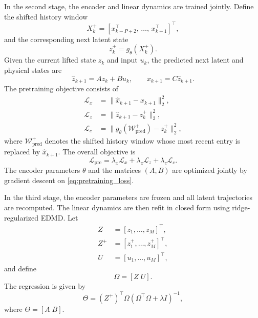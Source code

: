 \documentclass[journal]{IEEEtran}
\begin{document}
In the second stage, the encoder and linear dynamics are trained jointly. Define the shifted history window
\begin{equation}
    X_k^{+} = [x_{k-P+2}^\top,\,\ldots,\,x_{k+1}^\top]^\top,
\end{equation}
and the corresponding next latent state
\begin{equation}
    z_k^{+} = g_\theta(X_k^{+}).
\end{equation}
Given the current lifted state $z_k$ and input $u_k$, the predicted next latent and physical states are
\begin{equation}
    \hat{z}_{k+1} = A z_k + B u_k,
    \qquad
    \hat{x}_{k+1} = C \hat{z}_{k+1}.
\end{equation}
The pretraining objective consists of
\begin{align}
    \mathcal{L}_{x} &= \|\hat{x}_{k+1}-x_{k+1}\|_2^2, \label{eq:loss_x}\\
    \mathcal{L}_{z} &= \|\hat{z}_{k+1}-z_k^{+}\|_2^2, \label{eq:loss_z}\\
    \mathcal{L}_{c} &= \bigl\|g_\theta(\mathcal{W}^{+}_{\mathrm{pred}})-z_k^{+}\bigr\|_2^2, \label{eq:loss_c}
\end{align}
where $\mathcal{W}^{+}_{\mathrm{pred}}$ denotes the shifted history window whose most recent entry is replaced by $\hat{x}_{k+1}$. The overall objective is
\begin{equation}
    \mathcal{L}_{\mathrm{pre}} = \lambda_x \mathcal{L}_x + \lambda_z \mathcal{L}_z + \lambda_c \mathcal{L}_c.
    \label{eq:pretraining_loss}
\end{equation}
The encoder parameters $\theta$ and the matrices $(A,B)$ are optimized jointly by gradient descent on \eqref{eq:pretraining_loss}.

In the third stage, the encoder parameters are frozen and all latent trajectories are recomputed. The linear dynamics are then refit in closed form using ridge-regularized EDMD. Let
\begin{align}
    Z &= [z_1,\ldots,z_M]^\top, \\
    Z^{+} &= [z_1^{+},\ldots,z_M^{+}]^\top, \\
    U &= [u_1,\ldots,u_M]^\top,
\end{align}
and define
\begin{equation}
    \Omega = [Z\;U].
\end{equation}
The regression is given by
\begin{equation}
    \Theta = (Z^{+})^\top \Omega \left(\Omega^\top \Omega + \lambda I\right)^{-1},
    \label{eq:edmd_solution}
\end{equation}
where $\Theta = [A\;B]$.
\end{document}
